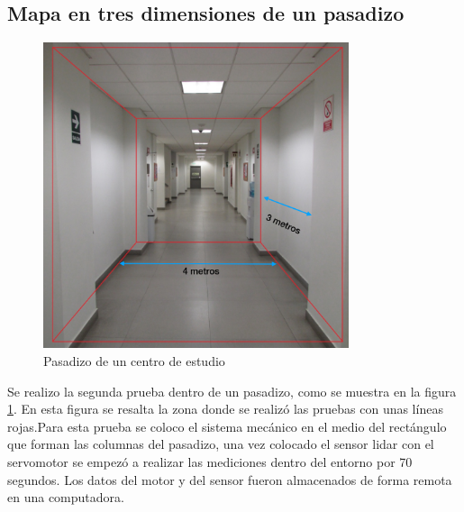\subsection{Mapa en tres dimensiones de un pasadizo}
\begin{figure}
  \centering \footnotesize
  \includegraphics[width=0.80\textwidth]{images/pasadizo_esan.JPG}
  \captionsetup{font=footnotesize}
  \caption{Pasadizo de un centro de estudio}
  \label{fig:pasadizoEsan}
\end{figure}

Se realizo la segunda prueba dentro de un pasadizo, como se muestra en la figura 
\ref{fig:pasadizoEsan}. En esta figura se resalta la zona donde se realizó las pruebas 
con unas líneas rojas.Para esta prueba se coloco el sistema mecánico en el medio del 
rectángulo que forman las columnas del pasadizo, una vez colocado el sensor lidar con 
el servomotor se empezó a realizar las mediciones dentro del entorno por 70 segundos. Los 
datos del motor y del sensor fueron almacenados de forma remota en una computadora. 

